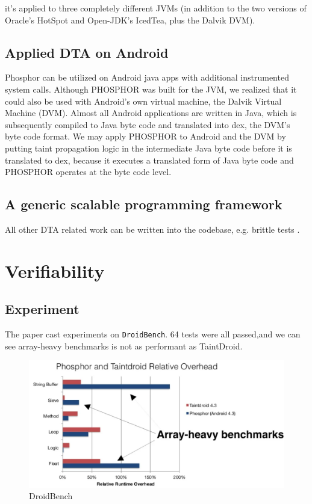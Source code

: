 \documentclass[conference]{IEEEtran}
\begin{document}
it's applied to three completely different JVMs (in addition to the two versions of Oracle’s HotSpot and Open-JDK’s IcedTea, plus the Dalvik DVM).
\subsection{Applied DTA on Android}
Phosphor can be utilized on Android java apps with additional instrumented system calls. \cite{b10} Although PHOSPHOR was built for the JVM, we realized that it could also be used with Android's own virtual machine, the Dalvik Virtual Machine (DVM). Almost all Android applications are written in Java, which is subsequently compiled to Java byte code and translated into dex, the DVM's byte code format. We may apply PHOSPHOR to Android and the DVM by putting taint propagation logic in the intermediate Java byte code before it is translated to dex, because it executes a translated form of Java byte code and PHOSPHOR operates at the byte code level.
\subsection{A generic scalable programming framework}
All other DTA related work can be written into the codebase, e.g. brittle tests \cite{b5}.
\section{Verifiability}
\subsection{Experiment}
The paper cast experiments on \texttt{DroidBench}. 64 tests were all passed,and we can see array-heavy benchmarks is not as performant as TaintDroid\cite{b10}.
\begin{figure}[htbp]
    \centering
    \includegraphics[width=0.6\columnwidth]{./taintdroid.png}
    \caption{DroidBench}
\end{figure}
\end{document}
